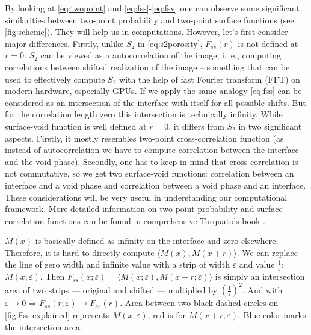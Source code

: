 \documentclass[reprint,amsmath,amssymb,aps,pre]{revtex4-1}
\begin{document}
By looking at \cref{eq:twopoint} and \cref{eq:fss}-\cref{eq:fsv} one can observe
some significant similarities between two-point probability and two-point
surface functions (see \cref{fig:scheme}). They will help us in
computations. However, let's first consider major differences. Firstly, unlike
$S_2$ in \cref{eq:s2porosity}, $F_{ss}(r)$ is not defined at $r=0$. $S_2$ can
be viewed as a autocorrelation of the image, i.~e., computing correlations
between shifted realization of the image -- something that can be used to
effectively compute $S_2$ with the help of fast Fourier transform (FFT) on
modern hardware, especially GPUs. If we apply the same analogy \cref{eq:fss}
can be considered as an intersection of the interface with itself for all
possible shifts. But for the correlation length zero this intersection is
technically infinity. While surface-void function is well defined at $r=0$, it
differs from $S_2$ in two significant aspects. Firstly, it mostly resembles
two-point cross-correlation function (as instead of autocorrelation we have to
compute correlation between the interface and the void phase). Secondly, one has
to keep in mind that cross-correlation is not commutative, so we get two
surface-void functions: correlation between an interface and a void phase and
correlation between a void phase and an interface. These considerations will be
very useful in understanding our computational framework. More detailed
information on two-point probability and surface correlation functions can be
found in comprehensive Torquato's book \cite{Torq_book}.

$M(x)$ is basically defined as infinity on the interface and zero elsewhere.
Therefore, it is hard to directly compute $\langle M(x), M(x + r) \rangle$.
We can replace the line of zero width and infinite value 
with a strip of width $\varepsilon$ and value $\frac{1}{\varepsilon}$: $M(x; \varepsilon)$. 
Then $F_{ss}(x; \varepsilon) = \langle M(x; \varepsilon), M(x + r; \varepsilon) \rangle$ 
is simply an intersection area of two strips 
--- original and shifted --- 
multiplied by $(\frac{1}{\varepsilon})^2$. 
And with $\varepsilon \to 0 \Rightarrow F_{ss}(r; \varepsilon) \to F_{ss}(r)$.
Area between two black dashed circles on \cref{fig:Fss-explained} 
represents $M(x; \varepsilon)$,
red is for $M(x + r; \varepsilon)$. 
Blue color marks the intersection area.
\end{document}
